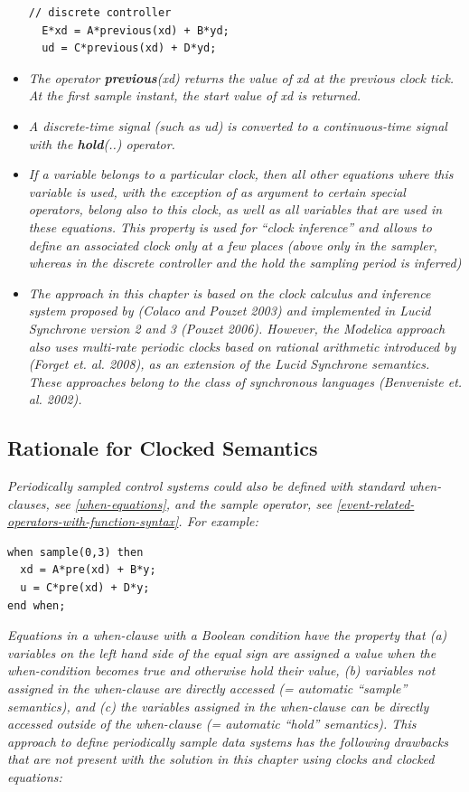 \documentclass[10pt,a4paper]{report}
\def\doublelabel#1{\label{#1}}
\begin{document}
\begin{itemize}
\begin{lstlisting}[language=modelica]
  // discrete controller
  E*xd = A*previous(xd) + B*yd;
  ud = C*previous(xd) + D*yd; 
\end{lstlisting}
\item
  \emph{The operator \textbf{previous}(xd) returns the value of xd at
  the previous clock tick. At the first sample instant, the start value
  of xd is returned.}
\item
  \emph{A discrete-time signal (such as ud) is converted to a
  continuous-time signal with the \textbf{hold}(..) operator.}
\item
  \emph{If a variable belongs to a particular clock, then all other
  equations where this variable is used, with the exception of as
  argument to certain special operators, belong also to this clock, as
  well as all variables that are used in these equations. This property
  is used for ``clock inference'' and allows to define an associated
  clock only at a few places (above only in the sampler, whereas in the
  discrete controller and the hold the sampling period is inferred)}
\item
  \emph{The approach in this chapter is based on the clock calculus and
  inference system proposed by (Colaco and Pouzet 2003) and implemented
  in Lucid Synchrone version 2 and 3 (Pouzet 2006). However, the
  Modelica approach also uses multi-rate periodic clocks based on
  rational arithmetic introduced by (Forget et. al. 2008), as an
  extension of the Lucid Synchrone semantics. These approaches belong to
  the class of synchronous languages (Benveniste et. al. 2002). }
\end{itemize}

\subsection{Rationale for Clocked Semantics}\doublelabel{rationale-for-clocked-semantics}

\emph{Periodically sampled control systems could also be defined with
standard when-clauses, see \ref{when-equations}, and the sample operator, see
\ref{event-related-operators-with-function-syntax}. For example:}
\begin{lstlisting}[language=modelica]
when sample(0,3) then
  xd = A*pre(xd) + B*y;
  u = C*pre(xd) + D*y;
end when;
\end{lstlisting}

\emph{Equations in a when-clause with a Boolean condition have the
property that (a) variables on the left hand side of the equal sign are
assigned a value when the when-condition becomes true and otherwise hold
their value, (b) variables not assigned in the when-clause are directly
accessed (= automatic ``sample'' semantics), and (c) the variables
assigned in the when-clause can be directly accessed outside of the
when-clause (= automatic ``hold'' semantics). This approach to define
periodically sample data systems has the following drawbacks that are
not present with the solution in this chapter using clocks and clocked
equations:}
\end{document}
